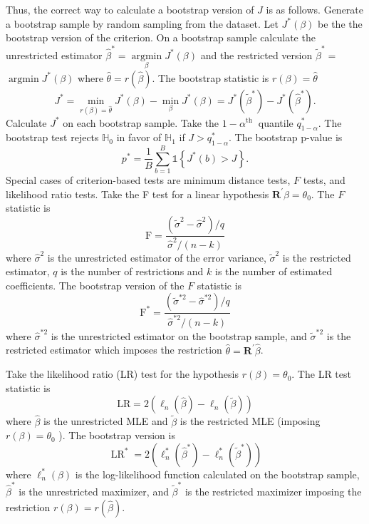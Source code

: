 \documentclass[10pt]{article}
\begin{document}
Thus, the correct way to calculate a bootstrap version of $J$ is as follows. Generate a bootstrap sample by random sampling from the dataset. Let $J^{*}(\beta)$ be the the bootstrap version of the criterion. On a bootstrap sample calculate the unrestricted estimator $\widehat{\beta}^{*}=\underset{\beta}{\operatorname{argmin}} J^{*}(\beta)$ and the restricted version $\widetilde{\beta}^{*}=$ $\operatorname{argmin} J^{*}(\beta)$ where $\widehat{\theta}=r(\widehat{\beta})$. The bootstrap statistic is $r(\beta)=\hat{\theta}$
$$
J^{*}=\min _{r(\beta)=\widehat{\theta}} J^{*}(\beta)-\min _{\beta} J^{*}(\beta)=J^{*}\left(\widetilde{\beta}^{*}\right)-J^{*}\left(\widehat{\beta}^{*}\right) .
$$
Calculate $J^{*}$ on each bootstrap sample. Take the $1-\alpha^{\text {th }}$ quantile $q_{1-\alpha}^{*}$. The bootstrap test rejects $\mathbb{H}_{0}$ in favor of $\mathbb{H}_{1}$ if $J>q_{1-\alpha}^{*}$. The bootstrap p-value is
$$
p^{*}=\frac{1}{B} \sum_{b=1}^{B} \mathbb{1}\left\{J^{*}(b)>J\right\} .
$$
Special cases of criterion-based tests are minimum distance tests, $F$ tests, and likelihood ratio tests. Take the F test for a linear hypothesis $\boldsymbol{R}^{\prime} \beta=\theta_{0}$. The $F$ statistic is
$$
\mathrm{F}=\frac{\left(\widetilde{\sigma}^{2}-\widehat{\sigma}^{2}\right) / q}{\widehat{\sigma}^{2} /(n-k)}
$$
where $\widehat{\sigma}^{2}$ is the unrestricted estimator of the error variance, $\widetilde{\sigma}^{2}$ is the restricted estimator, $q$ is the number of restrictions and $k$ is the number of estimated coefficients. The bootstrap version of the $F$ statistic is
$$
\mathrm{F}^{*}=\frac{\left(\widetilde{\sigma}^{* 2}-\widehat{\sigma}^{* 2}\right) / q}{\widehat{\sigma}^{* 2} /(n-k)}
$$
where $\widehat{\sigma}^{* 2}$ is the unrestricted estimator on the bootstrap sample, and $\widetilde{\sigma}^{* 2}$ is the restricted estimator which imposes the restriction $\widehat{\theta}=\boldsymbol{R}^{\prime} \widehat{\beta}$.

Take the likelihood ratio (LR) test for the hypothesis $r(\beta)=\theta_{0}$. The LR test statistic is
$$
\mathrm{LR}=2\left(\ell_{n}(\widehat{\beta})-\ell_{n}(\widetilde{\beta})\right)
$$
where $\widehat{\beta}$ is the unrestricted MLE and $\widetilde{\beta}$ is the restricted MLE (imposing $r(\beta)=\theta_{0}$ ). The bootstrap version is
$$
\operatorname{LR}^{*}=2\left(\ell_{n}^{*}\left(\widehat{\beta}^{*}\right)-\ell_{n}^{*}\left(\widetilde{\beta}^{*}\right)\right)
$$
where $\ell_{n}^{*}(\beta)$ is the log-likelihood function calculated on the bootstrap sample, $\widehat{\beta}^{*}$ is the unrestricted maximizer, and $\widetilde{\beta}^{*}$ is the restricted maximizer imposing the restriction $r(\beta)=r(\widehat{\beta})$.
\end{document}
